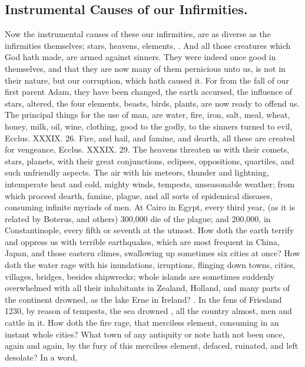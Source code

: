 {%
\clearpage{}
\subsection{Instrumental Causes of our Infirmities.}
Now the instrumental causes
of these our infirmities, are as diverse as the infirmities themselves;
stars, heavens, elements, \etc{}. And all those creatures which God hath
made, are armed against sinners. They were indeed once good in
themselves, and that they are now many of them pernicious unto us, is
not in their nature, but our corruption, which hath caused it. For from
the fall of our first parent Adam, they have been changed, the earth
accursed, the influence of stars, altered, the four elements, beasts,
birds, plants, are now ready to offend us. The principal things for the
use of man, are water, fire, iron, salt, meal, wheat, honey, milk, oil,
wine, clothing, good to the godly, to the sinners turned to evil,
Ecclus. {\junicoderomannumerals{}XXXIX}. 26. Fire, and hail, and famine, and dearth, all these
are created for vengeance, Ecclus. {\junicoderomannumerals{}XXXIX}. 29. The heavens threaten us
with their comets, stars, planets, with their great conjunctions,
eclipses, oppositions, quartiles, and such unfriendly aspects. The air
with his meteors, thunder and lightning, intemperate heat and cold,
mighty winds, tempests, unseasonable weather; from which proceed
dearth, famine, plague, and all sorts of epidemical diseases, consuming
infinite myriads of men. At Cairo in Egypt, every third year, (as it is
related by Boterus, and others) 300,000 die of the plague; and
200,000, in Constantinople, every fifth or seventh at the utmost. How
doth the earth terrify and oppress us with terrible earthquakes, which
are most frequent in China, Japan, and those eastern climes,
swallowing up sometimes six cities at once? How doth the water rage
with his inundations, irruptions, flinging down towns, cities,
villages, bridges, \etc{} besides shipwrecks; whole islands are sometimes
suddenly overwhelmed with all their inhabitants in Zealand,
Holland, and many parts of the continent drowned, as the lake Erne
in Ireland? . In the fens of Friesland 1230, by reason of tempests, the
sea drowned , all the
country almost, men and cattle in it. How doth the fire rage, that
merciless element, consuming in an instant whole cities? What town of
any antiquity or note hath not been once, again and again, by the fury
of this merciless element, defaced, ruinated, and left desolate? In a
word,

}

